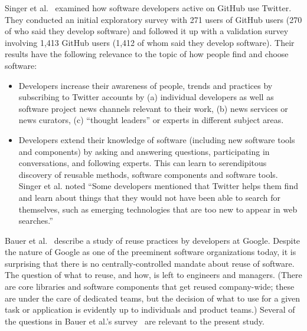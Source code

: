 \documentclass{casicswhitepaper}
\begin{document}
Singer et al.~\cite{singer2014software} examined how software developers active on GitHub use Twitter.  They conducted an initial exploratory survey with 271 users of GitHub users (270 of who said they develop software) and followed it up with a validation survey involving 1,413 GitHub users (1,412 of whom said they develop software).  Their results have the following relevance to the topic of how people find and choose software:

\begin{itemize}

\item Developers increase their awareness of people, trends and practices by subscribing to Twitter accounts by (a) individual developers as well as software project news channels relevant to their work, (b) news services or news curators, (c) ``thought leaders'' or experts in different subject areas.  

\item Developers extend their knowledge of software (including new software tools and components) by asking and answering questions, participating in conversations, and following experts.  This can learn to serendipitous discovery of reusable methods, software components and software tools.  Singer et al. noted ``Some developers mentioned that Twitter helps them find and learn about things that they would not have been able to search for themselves, such as emerging technologies that are too new to appear in web searches.''

\end{itemize}

Bauer et al.~\cite{bauer2014exploratory} describe a study of reuse practices by developers at Google.  Despite the nature of Google as one of the preeminent software organizations today, it is surprising that there is no centrally-controlled mandate about reuse of software.  The question of what to reuse, and how, is left to engineers and managers.  (There are core libraries and software components that get reused company-wide; these are under the care of dedicated teams, but the decision of what to use for a given task or application is evidently up to individuals and product teams.)  Several of the questions in Bauer et al.'s survey~\cite{bauer2014exploratory} are relevant to the present study.
\end{document}
